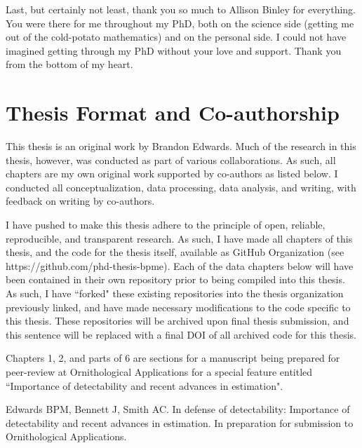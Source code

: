 \par Last, but certainly not least, thank you so much to Allison Binley for everything.
You were there for me throughout my PhD, both on the science side (getting me out of the cold-potato mathematics) and on the personal side.
I could not have imagined getting through my PhD without your love and support.
Thank you from the bottom of my heart.



\chapter*{Thesis Format and Co-authorship}


\par This thesis is an original work by Brandon Edwards.
Much of the research in this thesis, however, was conducted as part of various collaborations.
As such, all chapters are my own original work supported by co-authors as listed below.
I conducted all conceptualization, data processing, data analysis, and writing, with feedback on writing by co-authors.

\par I have pushed to make this thesis adhere to the principle of open, reliable, reproducible, and transparent research.
As such, I have made all chapters of this thesis, and the code for the thesis itself, available as GitHub Organization (see https://github.com/phd-thesis-bpme).
Each of the data chapters below will have been contained in their own repository prior to being compiled into this thesis.
As such, I have ``forked" these existing repositories into the thesis organization previously linked, and have made necessary modifications to the code specific to this thesis.
These repositories will be archived upon final thesis submission, and this sentence will be replaced with a final DOI of all archived code for this thesis.

\par Chapters 1, 2, and parts of 6 are sections for a manuscript being prepared for peer-review at Ornithological Applications for a special feature entitled ``Importance of detectability and recent advances in estimation".

Edwards BPM, Bennett J, Smith AC. In defense of detectability: Importance of detectability and recent advances in estimation. In preparation for submission to Ornithological Applications.

